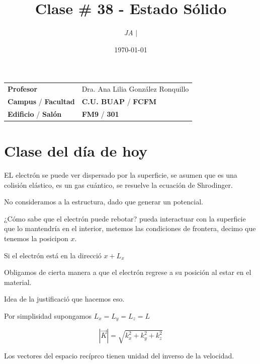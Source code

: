 \documentclass{article}
\title{Clase \# 38 - Estado Sólido}
\author{\emph{JA} $\boldsymbol{\mid}$}
\date{\today}
\begin{document}
\maketitle



\begin{mybox}
\noindent\begin{tabular}{@{}ll}
	{\bfseries{Profesor}} & Dra. Ana Lilia González Ronquillo\\
	\textcolor{prussianblue}{\bfseries{Campus}} / \textcolor{trueblue}{\bfseries{Facultad}}  & \textcolor{prussianblue}{\bfseries{C.U. BUAP}} /  \textcolor{trueblue}{\bfseries{FCFM}} \\
	\textcolor{prussianblue}{\bfseries{Edificio}} /  \textcolor{trueblue}{\bfseries{Salón}}    & 	\textcolor{prussianblue}{\bfseries{FM9}} /  \textcolor{trueblue}{\bfseries{301}}   
\end{tabular} 
\end{mybox} \vspace{1cm}

\tableofcontents

\vspace{2cm}


\section{Clase del día de hoy}

EL electrón se puede ver dispersado por la superficie, se asumen que es una colisión elástico, es un gas cuántico, se resuelve la ecuación de Shrodinger. 

No consideramos a la estructura, dado que generar un potencial.


¿Cómo sabe que el electrón puede rebotar? pueda interactuar con la superficie que lo mantendría en el interior, metemos las condiciones de frontera, decimo que tenemos la posicipon $x$. 

Si el electrón está en la direcció $x+L_{x}$

Obligamos de cierta manera a que el electrón regrese a su posición al estar en el material. 

Idea de la justificació que hacemos eso. 

Por simplisidad supongamos $L_{x}=L_{y}=L_{z}=L$


\[ |\vec{K}| = \sqrt{ k_{x}^{2} + k_{y}^{2} + k_{z}^{2}  } \]

Los vectores del espacio recíprco tienen unidad del inverso de la velocidad. 
\end{document}
